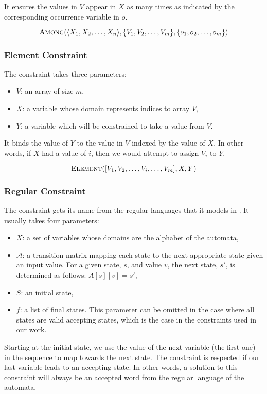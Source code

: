 \documentclass[../Document.tex]{subfiles}
\begin{document}
It ensures the values in $V$ appear in $X$ as many times as indicated by the corresponding occurrence variable in $o$.

$$
    \mbox{\sc Among}(\langle X_1, X_2, \ldots, X_n \rangle, \{V_1, V_2, \ldots, V_m\}, \{o_1, o_2, \ldots, o_m\})
$$

\subsubsection{Element Constraint}
The \element constraint takes three parameters:
\begin{itemize}
    \item $V$: an array of size $m$,
    \item $X$: a variable whose domain represents indices to array $V$,
    \item $Y$: a variable which will be constrained to take a value from $V$.
\end{itemize}

It binds the value of $Y$ to the value in $V$ indexed by the value of $X$. In other words, if $X$ had a value of $i$, then we would attempt to assign $V_i$ to $Y$.

$$
    \mbox{\sc Element}([V_1, V_2, \ldots, V_i, \ldots, V_m], X, Y)
$$

\subsubsection{Regular Constraint}
The \regular constraint gets its name from the regular languages that it models in \cp. It usually takes four parameters:
\begin{itemize}
    \item $X$: a set of variables whose domains are the alphabet of the automata,
    \item $\mathcal{A}$: a transition matrix mapping each state to the next appropriate state given an input value. For a given state, $s$, and value $v$, the next state, $s'$, is determined as follows: $A[s][v] = s'$,
    \item $S$: an initial state,
    \item $f$: a list of final states. This parameter can be omitted in the case where all states are valid accepting states, which is the case in the \regular constraints used in our work.
\end{itemize}

Starting at the initial state, we use the value of the next variable (\ie the first one) in the sequence to map towards the next state.
The constraint is respected if our last variable leads to an accepting state.
In other words, a solution to this constraint will always be an accepted word from the regular language of the automata.
\end{document}
